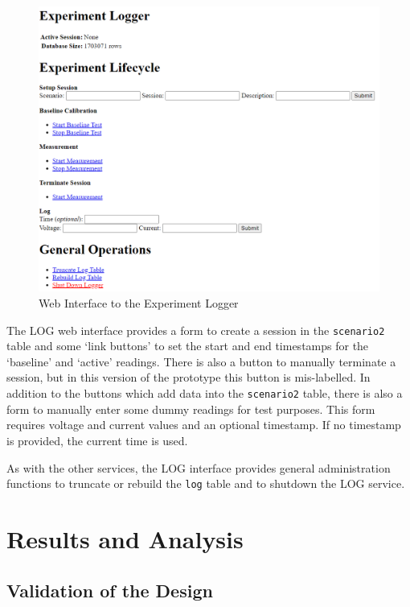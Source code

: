 \begin{figure}[ht!]
\centering
\includegraphics[width=\columnwidth]{Figures/screenshots/Logger.png}
\caption{Web Interface to the Experiment Logger}
\label{UI LOG}
\end{figure}

The LOG web interface provides a form to create a session in the \verb!scenario2! table and some `link buttons' to set the start and end timestamps for the `baseline' and `active' readings. There is also a button to manually terminate a session, but in this version of the prototype this button is mis-labelled. In addition to the buttons which add data into the \verb!scenario2! table, there is also a form to manually enter some dummy readings for test purposes. This form requires voltage and current values and an optional timestamp. If no timestamp is provided, the current time is used.

As with the other services, the LOG interface provides general administration functions to truncate or rebuild the \verb!log! table and to shutdown the LOG service.

\section{Results and Analysis}

\subsection{Validation of the Design}
\label{validation}

